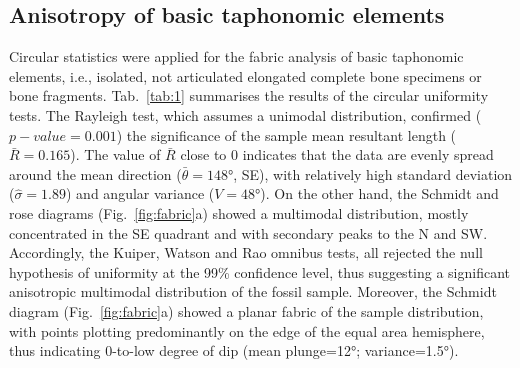 \documentclass[review,times,authoryear]{elsarticle} %
\begin{document}
\subsection{Anisotropy of basic taphonomic elements}

Circular statistics were applied for the fabric analysis of basic taphonomic elements, i.e., isolated, not articulated elongated complete bone specimens or bone fragments. Tab.~\ref{tab:1} summarises the results of the circular uniformity tests. The Rayleigh test, which assumes a unimodal distribution, confirmed ($p-value=0.001$) the significance of the sample mean resultant length ($\bar{R}=0.165$). The value of $\bar{R}$ close to 0 indicates that the data are evenly spread around the mean direction ($\bar{\theta}=148°$, SE), with relatively high standard deviation ($\hat{\sigma}=1.89$) and angular variance ($V=48°$). On the other hand, the Schmidt and rose diagrams (Fig.~\ref{fig:fabric}a) showed a multimodal distribution, mostly concentrated in the SE quadrant and with secondary peaks to the N and SW. Accordingly, the Kuiper, Watson and Rao omnibus tests, all rejected the null hypothesis of uniformity at the 99\% confidence level, thus suggesting a significant anisotropic multimodal distribution of the fossil sample. Moreover, the Schmidt diagram (Fig.~\ref{fig:fabric}a) showed a planar fabric of the sample distribution, with points plotting predominantly on the edge of the equal area hemisphere, thus indicating 0-to-low degree of dip (mean plunge=12°; variance=1.5°).

\begin{table}[]
  \centering
  \caption{Values and $p-values$ of circular uniformity test statistics.}
  \label{tab:1}
  \vspace{.1in}
\end{table}
\end{document}
